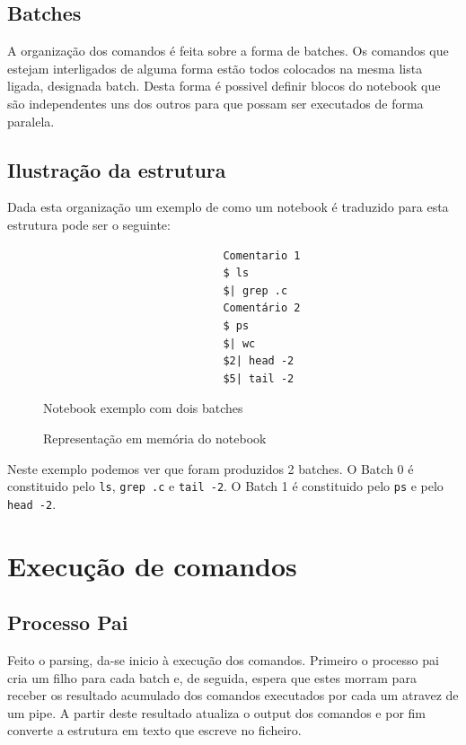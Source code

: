 \documentclass[12pt,a4paper]{report}
\begin{document}
    \section{Batches}
        A organização dos comandos é feita sobre a forma de batches. Os comandos
        que estejam interligados de alguma forma estão todos colocados na mesma
        lista ligada, designada batch. Desta forma é possivel definir blocos do
        notebook que são independentes uns dos outros para que possam ser
        executados de forma paralela.

    \section{Ilustração da estrutura}
        Dada esta organização um exemplo de como um notebook é traduzido para
        esta estrutura pode ser o seguinte:

        \begin{figure}[H]
            \begin{verbatim}
                            Comentario 1
                            $ ls
                            $| grep .c
                            Comentário 2
                            $ ps
                            $| wc
                            $2| head -2
                            $5| tail -2
            \end{verbatim}
            \caption{Notebook exemplo com dois batches}
        \end{figure}
        \begin{figure}[H]
            \centering
            
            \caption{Representação em memória do notebook}
        \end{figure}

        Neste exemplo podemos ver que foram produzidos 2 batches. O Batch 0 é
        constituido pelo \texttt{ls}, \texttt{grep .c} e
        \texttt{tail -2}. O Batch 1 é constituido pelo
        \texttt{ps} e pelo \texttt{head -2}.

\chapter{Execução de comandos}

    \section{Processo Pai}
        Feito o parsing, da-se inicio à execução dos comandos. Primeiro o
        processo pai cria um filho para cada batch e, de seguida, espera que
        estes morram para receber os resultado acumulado dos comandos
        executados por cada um atravez de um pipe. A partir deste resultado
        atualiza o output dos comandos e por fim converte a estrutura em
        texto que escreve no ficheiro.
\end{document}
